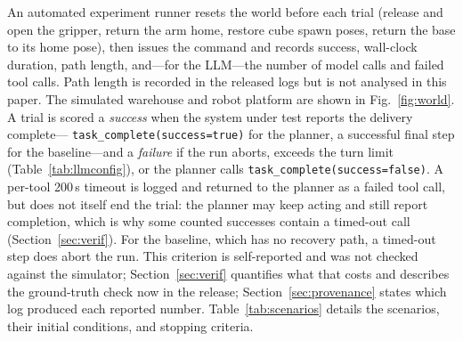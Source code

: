 \documentclass[conference]{IEEEtran}
\begin{document}
An automated experiment runner resets the world before each trial (release
and open the gripper, return the arm home, restore cube spawn poses,
return the base to its home pose), then issues the command and records
success, wall-clock duration, path length, and---for the LLM---the number
of model calls and failed tool calls. Path length is recorded in the
released logs but is not analysed in this paper. The simulated warehouse and robot
platform are shown in Fig.~\ref{fig:world}. A trial is scored a
\emph{success} when the system under test reports the delivery complete---
\texttt{task\_complete(success=true)} for the planner, a successful final
step for the baseline---and a \emph{failure} if the run aborts, exceeds the
turn limit (Table~\ref{tab:llmconfig}), or the planner calls
\texttt{task\_complete(success=false)}. A per-tool 200\,s timeout is logged
and returned to the planner as a failed tool call, but does not itself end
the trial: the planner may keep acting and still report completion, which is
why some counted successes contain a timed-out call
(Section~\ref{sec:verif}). For the baseline, which has no recovery path, a
timed-out step does abort the run. This criterion is self-reported and was
not checked against the simulator;
Section~\ref{sec:verif} quantifies what that costs and describes the
ground-truth check now in the release; Section~\ref{sec:provenance} states
which log produced each reported number. Table~\ref{tab:scenarios}
details the scenarios, their initial conditions, and stopping criteria.
\end{document}
